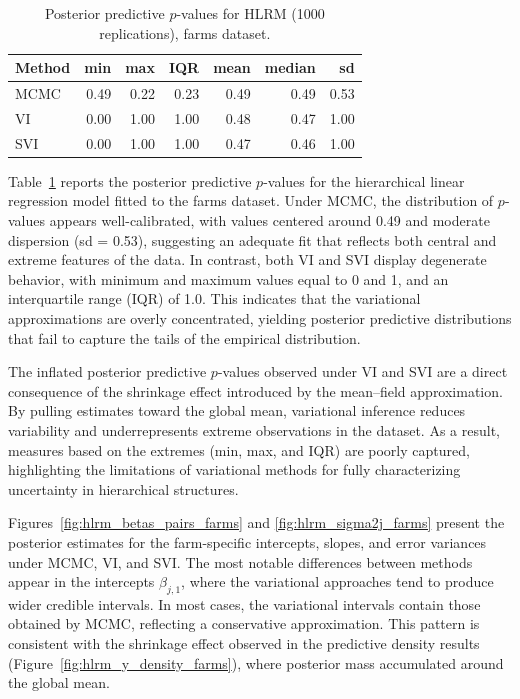 \begin{table}[!h]
\centering
\caption{\label{tab:PPvalsHLRM}Posterior predictive $p$-values for HLRM (1000 replications), farms dataset.}
\centering
\begin{tabular}[t]{lrrrrrr}
\toprule
\textbf{Method} & \textbf{min} & \textbf{max} & \textbf{IQR} & \textbf{mean} & \textbf{median} & \textbf{sd} \\
\midrule
MCMC & 0.49 & 0.22 & 0.23 & 0.49 & 0.49 & 0.53\\
VI & 0.00 & 1.00 & 1.00 & 0.48 & 0.47 & 1.00\\
SVI & 0.00 & 1.00 & 1.00 & 0.47 & 0.46 & 1.00\\
\bottomrule
\end{tabular}
\end{table}

\newpage

Table~\ref{tab:PPvalsHLRM} reports the posterior predictive $p$-values for the hierarchical linear regression model fitted to the farms dataset. Under MCMC, the distribution of $p$-values appears well-calibrated, with values centered around 0.49 and moderate dispersion (sd = 0.53), suggesting an adequate fit that reflects both central and extreme features of the data. In contrast, both VI and SVI display degenerate behavior, with minimum and maximum values equal to 0 and 1, and an interquartile range (IQR) of 1.0. This indicates that the variational approximations are overly concentrated, yielding posterior predictive distributions that fail to capture the tails of the empirical distribution.  

\vspace{0.5cm}

The inflated posterior predictive $p$-values observed under VI and SVI are a direct consequence of the shrinkage effect introduced by the mean–field approximation. By pulling estimates toward the global mean, variational inference reduces variability and underrepresents extreme observations in the dataset. As a result, measures based on the extremes (min, max, and IQR) are poorly captured, highlighting the limitations of variational methods for fully characterizing uncertainty in hierarchical structures.

\vspace{0.5cm}

Figures~\ref{fig:hlrm_betas_pairs_farms} and \ref{fig:hlrm_sigma2j_farms} present the posterior estimates for the farm-specific intercepts, slopes, and error variances under MCMC, VI, and SVI. The most notable differences between methods appear in the intercepts $\beta_{j,1}$, where the variational approaches tend to produce wider credible intervals. In most cases, the variational intervals contain those obtained by MCMC, reflecting a conservative approximation. This pattern is consistent with the shrinkage effect observed in the predictive density results (Figure~\ref{fig:hlrm_y_density_farms}), where posterior mass accumulated around the global mean. 

